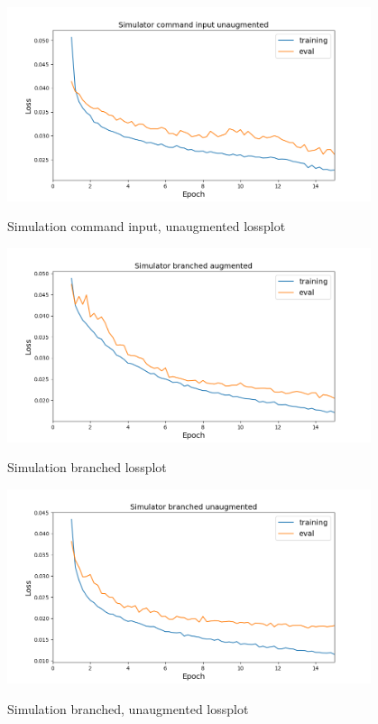 \documentclass[a4paper]{article}
\begin{document}
\begin{figure}[!htbp]
  \centering
  \includegraphics[width=0.95\textwidth]{figures/sim_command_input_nonaug_lossplot}
  \label{fig:unaugmented_command_loss}
  \caption{Simulation command input, unaugmented lossplot}
\end{figure}
\begin{figure}[!htbp]
  \centering
  \includegraphics[width=0.95\textwidth]{figures/sim_branched_aug_lossplot}
  \label{fig:augmented_branched_loss}
  \caption{Simulation branched lossplot}
\end{figure}
\begin{figure}[!htbp]
  \centering
  \includegraphics[width=0.95\textwidth]{figures/sim_branched_nonaug_lossplot}
  \label{fig:unaugmented_branched_loss}
  \caption{Simulation branched, unaugmented lossplot}
\end{figure}
\end{document}
